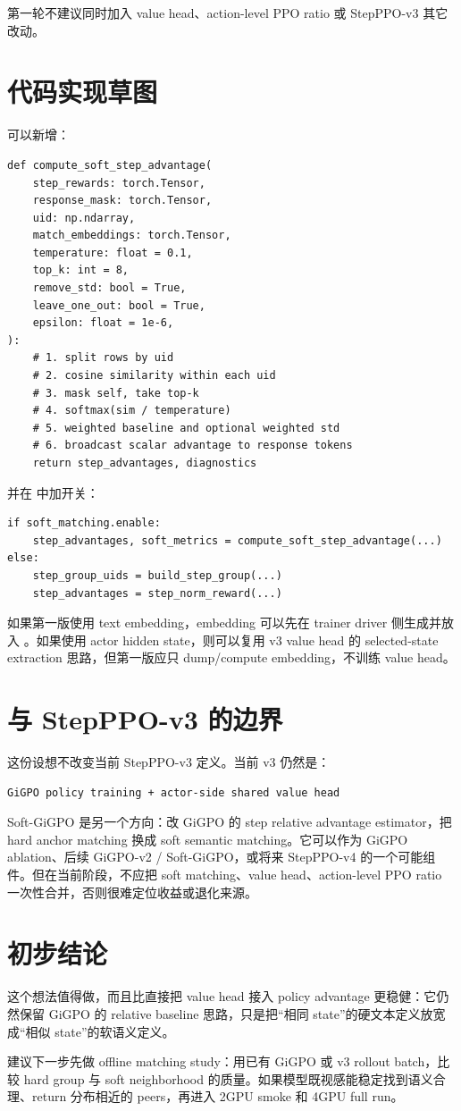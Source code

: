 \documentclass[10pt]{ctexart}
\begin{document}
第一轮不建议同时加入 value head、action-level PPO ratio 或 StepPPO-v3 其它改动。

\section{代码实现草图}
可以新增：
\begin{lstlisting}
def compute_soft_step_advantage(
    step_rewards: torch.Tensor,
    response_mask: torch.Tensor,
    uid: np.ndarray,
    match_embeddings: torch.Tensor,
    temperature: float = 0.1,
    top_k: int = 8,
    remove_std: bool = True,
    leave_one_out: bool = True,
    epsilon: float = 1e-6,
):
    # 1. split rows by uid
    # 2. cosine similarity within each uid
    # 3. mask self, take top-k
    # 4. softmax(sim / temperature)
    # 5. weighted baseline and optional weighted std
    # 6. broadcast scalar advantage to response tokens
    return step_advantages, diagnostics
\end{lstlisting}

并在  中加开关：
\begin{lstlisting}
if soft_matching.enable:
    step_advantages, soft_metrics = compute_soft_step_advantage(...)
else:
    step_group_uids = build_step_group(...)
    step_advantages = step_norm_reward(...)
\end{lstlisting}

如果第一版使用 text embedding，embedding 可以先在 trainer driver 侧生成并放入 。如果使用 actor hidden state，则可以复用 v3 value head 的 selected-state extraction 思路，但第一版应只 dump/compute embedding，不训练 value head。

\section{与 StepPPO-v3 的边界}
这份设想不改变当前 StepPPO-v3 定义。当前 v3 仍然是：
\begin{lstlisting}
GiGPO policy training + actor-side shared value head
\end{lstlisting}

Soft-GiGPO 是另一个方向：改 GiGPO 的 step relative advantage estimator，把 hard anchor matching 换成 soft semantic matching。它可以作为 GiGPO ablation、后续 GiGPO-v2 / Soft-GiGPO，或将来 StepPPO-v4 的一个可能组件。但在当前阶段，不应把 soft matching、value head、action-level PPO ratio 一次性合并，否则很难定位收益或退化来源。

\section{初步结论}
这个想法值得做，而且比直接把 value head 接入 policy advantage 更稳健：它仍然保留 GiGPO 的 relative baseline 思路，只是把“相同 state”的硬文本定义放宽成“相似 state”的软语义定义。

建议下一步先做 offline matching study：用已有 GiGPO 或 v3 rollout batch，比较 hard group 与 soft neighborhood 的质量。如果模型既视感能稳定找到语义合理、return 分布相近的 peers，再进入 2GPU smoke 和 4GPU full run。
\end{document}
